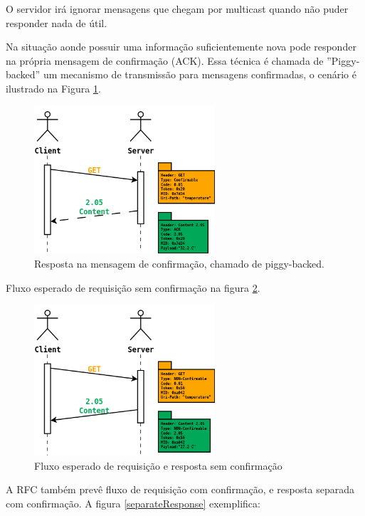 O servidor ir\'a ignorar mensagens que chegam por multicast quando n\~ao puder responder nada de \'util.

Na situa\c{c}\~ao aonde possuir uma informa\c{c}\~ao suficientemente nova pode responder na pr\'opria mensagem de confirma\c{c}\~ao (ACK). Essa t\'ecnica \'e chamada de ''Piggy-backed'' um mecanismo de transmiss\~ao para mensagens confirmadas, o cen\'ario \'e ilustrado na Figura \ref{piggyBacked}.\cite{draft-ietf-core-coap-18}
\begin{figure}[h]
   \label{piggyBacked}
   \centering
   \includegraphics[width=0.6\textwidth]{figuras/piggybacked.png}
   \caption{Resposta na mensagem de confirma\c{c}\~ao, chamado de piggy-backed.}
\end{figure}

Fluxo esperado de requisi\c{c}\~ao sem confirma\c{c}\~ao na figura \ref{nonConfirmable}.
\begin{figure}[h]
   \label{nonConfirmable}
   \centering
   \includegraphics[width=0.6\textwidth]{figuras/nonconfirmable.png}
   \caption{Fluxo esperado de requisi\c{c}\~ao e resposta sem confirma\c{c}\~ao}
\end{figure}

A RFC tamb\'em prev\^e fluxo de requisi\c{c}\~ao com confirma\c{c}\~ao, e resposta separada com confirma\c{c}\~ao. A figura \ref{separateResponse} exemplifica:

